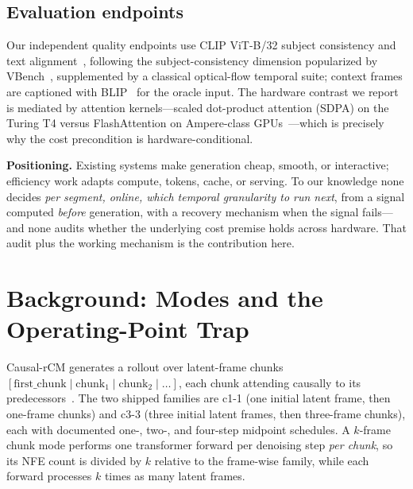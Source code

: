 \documentclass[journal]{IEEEtran}
\newcommand{\cfine}{\textup{c1-1}}
\newcommand{\ccoarse}{\textup{c3-3}}
\begin{document}
\subsection{Evaluation endpoints}
Our independent quality endpoints use CLIP ViT-B/32 subject consistency and text alignment~\cite{radford2021clip}, following the subject-consistency dimension popularized by VBench~\cite{huang2024vbench}, supplemented by a classical optical-flow temporal suite; context frames are captioned with BLIP~\cite{li2022blip} for the oracle input. The hardware contrast we report is mediated by attention kernels---scaled dot-product attention (SDPA) on the Turing T4 versus FlashAttention on Ampere-class GPUs~\cite{dao2022flashattention}---which is precisely why the cost precondition is hardware-conditional.

\textbf{Positioning.} Existing systems make generation cheap, smooth, or interactive; efficiency work adapts compute, tokens, cache, or serving. To our knowledge none decides \emph{per segment, online, which temporal granularity to run next}, from a signal computed \emph{before} generation, with a recovery mechanism when the signal fails---and none audits whether the underlying cost premise holds across hardware. That audit plus the working mechanism is the contribution here.

\section{Background: Modes and the Operating-Point Trap}
\label{sec:background}

Causal-rCM generates a rollout over latent-frame chunks $[\text{first\_chunk} \mid \text{chunk}_1 \mid \text{chunk}_2 \mid \dots]$, each chunk attending causally to its predecessors~\cite{zhengCausalrCMUnifiedTeacherForcing2026}. The two shipped families are \cfine{} (one initial latent frame, then one-frame chunks) and \ccoarse{} (three initial latent frames, then three-frame chunks), each with documented one-, two-, and four-step midpoint schedules. A $k$-frame chunk mode performs one transformer forward per denoising step \emph{per chunk}, so its NFE count is divided by $k$ relative to the frame-wise family, while each forward processes $k$ times as many latent frames.
\end{document}
